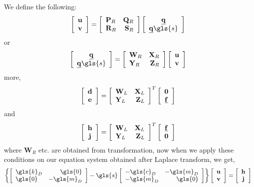 We define the following:
\begin{align}
\left[\begin{array}{c}\mathbf{u}\\\mathbf{v}\end{array}\right] = \mat{\mathbf{P}_R}{\mathbf{Q}_R}{\mathbf{R}_R}{\mathbf{S}_R} \left[\begin{array}{c} \underline{\mathbf{q}} \\ \underline{\mathbf{q}}\gls{s}\end{array}\right]
\end{align}
or
\begin{align}
\left[\begin{array}{c}\underline{\mathbf{q}} \\ \underline{\mathbf{q}}\gls{s} \end{array}\right] = \mat{\mathbf{W}_R}{\mathbf{X}_R}{\mathbf{Y}_R}{\mathbf{Z}_R} \left[\begin{array}{c}\mathbf{u}\\\mathbf{v}\end{array}\right]
\end{align}
more,
\begin{align}
\left[\begin{array}{c}\mathbf{d}\\\mathbf{e}\end{array}\right] = {\left[ \begin{array}{lr} \mathbf{W}_L& \mathbf{X}_L\\ \mathbf{Y}_L& \mathbf{Z}_L\end{array}\right]}^T \left[\begin{array}{c}\mathbf{0}\\\underline{\mathbf{f}}\end{array}\right]
\end{align}
and
\begin{align}
\left[\begin{array}{c}\mathbf{h}\\\mathbf{j}\end{array}\right] = {\left[ \begin{array}{lr} \mathbf{W}_L& \mathbf{X}_L\\ \mathbf{Y}_L& \mathbf{Z}_L\end{array}\right]}^T \left[\begin{array}{c}\underline{\mathbf{f}}\\\mathbf{0}\end{array}\right]
\end{align}
where $\mathbf{W}_R$ etc. are obtained from transformation, now when we apply these conditions on our equation system obtained after Laplace transform, we get,
\begin{align}
\left\{
\mat{\gls{k}_D}{\gls{0}}{\gls{0}}{-\gls{m}_D} - \gls{s} \mat{-\gls{c}_D}{-\gls{m}_D}{-\gls{m}_D}{\gls{0}}
\right\} \left[\begin{array}{c}\mathbf{u}\\\mathbf{v}\end{array}\right] = \left[\begin{array}{c}\mathbf{h}\\\mathbf{j}\end{array}\right]
\end{align}

